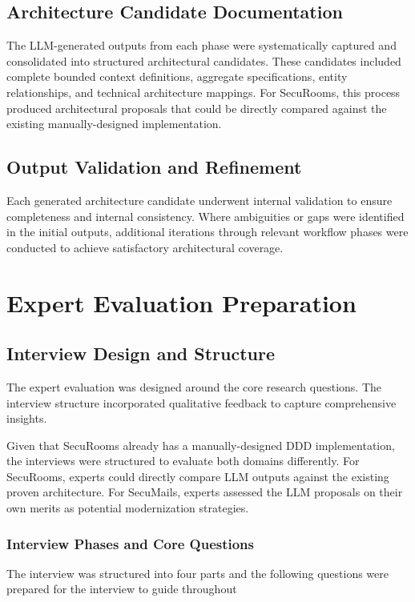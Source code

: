 \subsection{Architecture Candidate Documentation}
The LLM-generated outputs from each phase were systematically captured and consolidated into structured architectural candidates. These candidates included complete bounded context definitions, aggregate specifications, entity relationships, and technical architecture mappings. For SecuRooms, this process produced architectural proposals that could be directly compared against the existing manually-designed implementation.

\subsection{Output Validation and Refinement}
Each generated architecture candidate underwent internal validation to ensure completeness and internal consistency. Where ambiguities or gaps were identified in the initial outputs, additional iterations through relevant workflow phases were conducted to achieve satisfactory architectural coverage.

\section{Expert Evaluation Preparation}

\subsection{Interview Design and Structure}
The expert evaluation was designed around the core research questions. The interview structure incorporated qualitative feedback to capture comprehensive insights.

Given that SecuRooms already has a manually-designed DDD implementation, the interviews were structured to evaluate both domains differently. For SecuRooms, experts could directly compare LLM outputs against the existing proven architecture. For SecuMails, experts assessed the LLM proposals on their own merits as potential modernization strategies.

\subsubsection{Interview Phases and Core Questions}
\label{sec:interview_phases}

The interview was structured into four parts and the following questions were prepared for the interview to guide throughout

